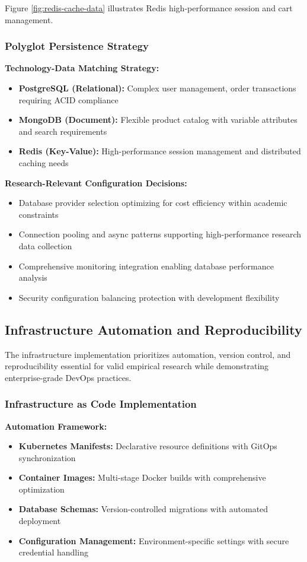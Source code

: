 Figure \ref{fig:redis-cache-data} illustrates Redis high-performance session and cart management.

\subsubsection{Polyglot Persistence Strategy}

\textbf{Technology-Data Matching Strategy:}
\begin{itemize}
\item \textbf{PostgreSQL (Relational):} Complex user management, order transactions requiring ACID compliance
\item \textbf{MongoDB (Document):} Flexible product catalog with variable attributes and search requirements
\item \textbf{Redis (Key-Value):} High-performance session management and distributed caching needs
\end{itemize}

\textbf{Research-Relevant Configuration Decisions:}
\begin{itemize}
\item Database provider selection optimizing for cost efficiency within academic constraints
\item Connection pooling and async patterns supporting high-performance research data collection
\item Comprehensive monitoring integration enabling database performance analysis
\item Security configuration balancing protection with development flexibility
\end{itemize}

\subsection{Infrastructure Automation and Reproducibility}

The infrastructure implementation prioritizes automation, version control, and reproducibility essential for valid empirical research while demonstrating enterprise-grade DevOps practices.

\subsubsection{Infrastructure as Code Implementation}

\textbf{Automation Framework:}
\begin{itemize}
\item \textbf{Kubernetes Manifests:} Declarative resource definitions with GitOps synchronization
\item \textbf{Container Images:} Multi-stage Docker builds with comprehensive optimization
\item \textbf{Database Schemas:} Version-controlled migrations with automated deployment
\item \textbf{Configuration Management:} Environment-specific settings with secure credential handling
\end{itemize}

